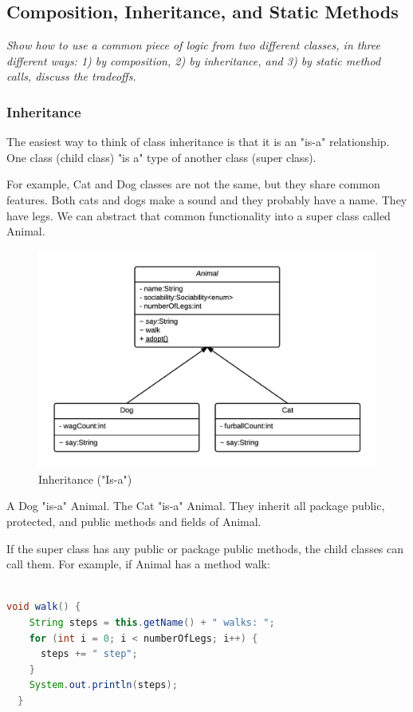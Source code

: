 \subsection{Composition, Inheritance, and Static Methods}
\textit{Show how to use a common piece of logic from two different classes, in three different ways: 1) by composition, 2) by inheritance, and 3) by static method calls, discuss the tradeoffs.}

\subsubsection{Inheritance}\label{s:inheritance}
The easiest way to think of class inheritance is that it is an "is-a" relationship. One class (child class) "is a" type of another class (super class).

For example, Cat and Dog classes are not the same, but they share common features. Both cats and dogs make a sound and they probably have a name. They have legs. We can abstract that common functionality into a super class called Animal.

\begin{figure}[H]\centering %
\includegraphics[width=0.9\linewidth, frame]{images/inheritance}
\caption{Inheritance ("Is-a")}
\label{fig:inheritance}
\end{figure}

A Dog "is-a" Animal. The Cat "is-a" Animal. They inherit all package public, protected, and public methods and fields of Animal.

If the super class has any public or package public methods, the child classes can call them. For example, if Animal has a method walk:
\begin{lstlisting}[language=Java]

void walk() {
    String steps = this.getName() + " walks: ";
    for (int i = 0; i < numberOfLegs; i++) {
      steps += " step";
    }
    System.out.println(steps);
  }

\end{lstlisting}

